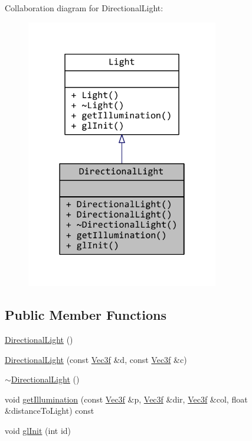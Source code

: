 Collaboration diagram for Directional\+Light\+:
\nopagebreak
\begin{figure}[H]
\begin{center}
\leavevmode
\includegraphics[width=238pt]{classDirectionalLight__coll__graph}
\end{center}
\end{figure}
\subsection*{Public Member Functions}
\begin{DoxyCompactItemize}
\item 
\hyperlink{classDirectionalLight_a949b877ae041b9818f47eb812d80fa1b}{Directional\+Light} ()
\item 
\hyperlink{classDirectionalLight_ab824e6229f84e9c6cd7976f4eb1d99f7}{Directional\+Light} (const \hyperlink{classVec3f}{Vec3f} \&d, const \hyperlink{classVec3f}{Vec3f} \&c)
\item 
\hyperlink{classDirectionalLight_ac4aca6c806e752c65ffea9b2f237b245}{$\sim$\+Directional\+Light} ()
\item 
void \hyperlink{classDirectionalLight_a7aec5040cac4e55912790737e05ce492}{get\+Illumination} (const \hyperlink{classVec3f}{Vec3f} \&p, \hyperlink{classVec3f}{Vec3f} \&dir, \hyperlink{classVec3f}{Vec3f} \&col, float \&distance\+To\+Light) const 
\item 
void \hyperlink{classDirectionalLight_a499c1871fbe726e14424921465d66c90}{gl\+Init} (int id)
\end{DoxyCompactItemize}


